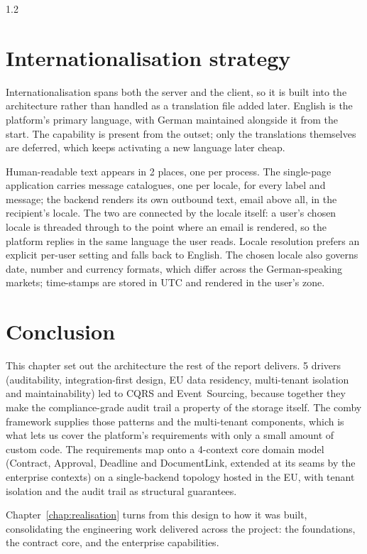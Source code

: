 \begin{spacing}{1.2}
\section{Internationalisation strategy}
\label{sec:i18n}

Internationalisation spans both the server and the client, so it is built
into the architecture rather than handled as a translation file added later.
English is the platform's primary language, with German maintained alongside
it from the start. The capability is present from the outset; only the
translations themselves are deferred, which keeps activating a new language
later cheap.

Human-readable text appears in 2 places, one per process. The single-page
application carries message catalogues, one per locale, for every label and
message; the backend renders its own outbound text, email above all, in
the recipient's locale. The two are connected by the locale itself: a user's
chosen locale is threaded through to the point where an email is rendered, so
the platform replies in the same language the user reads. Locale
resolution prefers an explicit per-user setting and falls back to English. The
chosen locale also governs date, number and currency formats, which differ
across the German-speaking markets; time-stamps are stored in UTC and rendered
in the user's zone.

\section*{Conclusion}
This chapter set out the architecture the rest of the report delivers. 5
drivers (auditability, integration-first design, EU data residency,
multi-tenant isolation and maintainability) led to CQRS and
Event~Sourcing, because together they make the compliance-grade audit trail
a property of the storage itself. The comby framework
supplies those patterns and the multi-tenant components, which is what lets
us cover the platform's requirements with only a small amount of custom code. The
requirements map onto a 4-context core domain model (Contract, Approval,
Deadline and DocumentLink, extended at its seams by the enterprise contexts)
on a single-backend topology hosted in the EU, with tenant isolation
and the audit trail as structural guarantees.

Chapter~\ref{chap:realisation} turns from this design to how it was
built, consolidating the engineering work delivered across the project:
the foundations, the contract core, and the enterprise capabilities.

\end{spacing}
